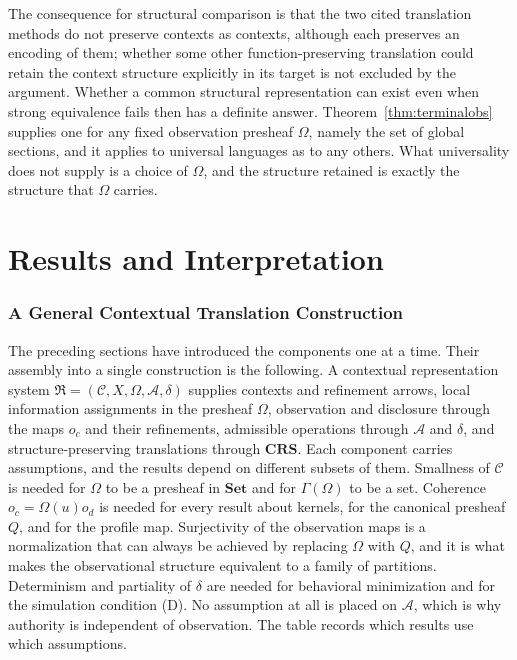 \documentclass[11pt]{article}
\theoremstyle{definition}
\theoremstyle{remark}
\newcommand{\cC}{\mathcal C}
\newcommand{\cA}{\mathcal A}
\newcommand{\fR}{\mathfrak R}
\newcommand{\Set}{\mathbf{Set}}
\newcommand{\CRS}{\mathbf{CRS}}
\begin{document}
The consequence for structural comparison is that the two cited translation methods do not preserve contexts as contexts, although each preserves an encoding of them; whether some other function-preserving translation could retain the context structure explicitly in its target is not excluded by the argument. Whether a common structural representation can exist even when strong equivalence fails then has a definite answer. Theorem~\ref{thm:terminalobs} supplies one for any fixed observation presheaf $\Omega$, namely the set of global sections, and it applies to universal languages as to any others. What universality does not supply is a choice of $\Omega$, and the structure retained is exactly the structure that $\Omega$ carries.
\part{Results and Interpretation}

\section{A General Contextual Translation Construction}

The preceding sections have introduced the components one at a time. Their assembly into a single construction is the following. A contextual representation system $\fR=(\cC,X,\Omega,\cA,\delta)$ supplies contexts and refinement arrows, local information assignments in the presheaf $\Omega$, observation and disclosure through the maps $o_c$ and their refinements, admissible operations through $\cA$ and $\delta$, and structure-preserving translations through $\CRS$. Each component carries assumptions, and the results depend on different subsets of them. Smallness of $\cC$ is needed for $\Omega$ to be a presheaf in $\Set$ and for $\Gamma(\Omega)$ to be a set. Coherence $o_c=\Omega(u)o_d$ is needed for every result about kernels, for the canonical presheaf $Q$, and for the profile map. Surjectivity of the observation maps is a normalization that can always be achieved by replacing $\Omega$ with $Q$, and it is what makes the observational structure equivalent to a family of partitions. Determinism and partiality of $\delta$ are needed for behavioral minimization and for the simulation condition (D). No assumption at all is placed on $\cA$, which is why authority is independent of observation. The table records which results use which assumptions.
\end{document}
